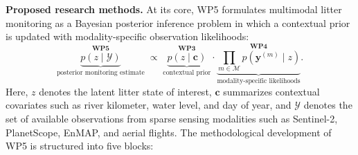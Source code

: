 \documentclass{scrartcl}
\begin{document}
\textbf{Proposed research methods.} At its core, WP5 formulates multimodal litter monitoring as a Bayesian posterior inference problem in which a contextual prior is updated with modality-specific observation likelihoods:
\[
\underbrace{\overset{\mathbf{WP5}}{p(z \mid \mathcal{Y})}}_{\text{posterior monitoring estimate}}
\;\propto\;
\underbrace{\overset{\mathbf{WP3}}{p(z \mid \mathbf{c})}}_{\text{contextual prior}}
\cdot
\underbrace{\overset{\mathbf{WP4}}{\prod_{m \in \mathcal{M}} p\!\left(\mathbf{y}^{(m)} \mid z\right)}}_{\text{modality-specific likelihoods}}.
\]
Here, \(z\) denotes the latent litter state of interest, \(\mathbf{c}\) summarizes contextual covariates such as river kilometer, water level, and day of year, and \(\mathcal{Y}\) denotes the set of available observations from sparse sensing modalities such as Sentinel-2, PlanetScope, EnMAP, and aerial flights. The methodological development of WP5 is structured into five blocks:
\end{document}
